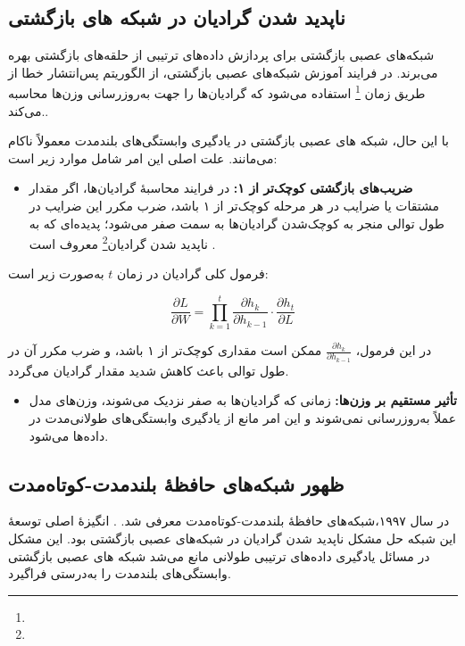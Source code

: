 \subsection{ناپدید شدن گرادیان در شبکه های بازگشتی}
شبکه‌های عصبی بازگشتی برای پردازش داده‌های ترتیبی از حلقه‌های بازگشتی بهره می‌برند. در فرایند آموزش شبکه‌های عصبی بازگشتی، از الگوریتم پس‌انتشار خطا از طریق زمان \footnote{} استفاده می‌شود که گرادیان‌ها را جهت به‌روزرسانی وزن‌ها محاسبه می‌کند.\cite{rumelhart1986learning}.

با این حال، شبکه های عصبی بازگشتی در یادگیری وابستگی‌های بلندمدت معمولاً ناکام می‌مانند. علت اصلی این امر شامل موارد زیر است:

\begin{itemize}
	\item \textbf{ضریب‌های بازگشتی کوچک‌تر از ۱:}
	در فرایند محاسبهٔ گرادیان‌ها، اگر مقدار مشتقات یا ضرایب در هر مرحله کوچک‌تر از ۱ باشد، ضرب مکرر این ضرایب در طول توالی منجر به کوچک‌شدن گرادیان‌ها به سمت صفر می‌شود؛ پدیده‌ای که به ناپدید شدن گرادیان\footnote{} معروف است
	\cite{hochreiter1998vanishing}.
\end{itemize}

فرمول کلی گرادیان در زمان \( t \) به‌صورت زیر است:

\begin{equation}
	\frac{\partial L}{\partial W} = \prod_{k=1}^{t} \frac{\partial h_k}{\partial h_{k-1}} \cdot \frac{\partial h_t}{\partial L}
\end{equation}

در این فرمول، \( \frac{\partial h_k}{\partial h_{k-1}} \) ممکن است مقداری کوچک‌تر از ۱ باشد، و ضرب مکرر آن در طول توالی باعث کاهش شدید مقدار گرادیان می‌گردد.

\begin{itemize}
	\item \textbf{تأثیر مستقیم بر وزن‌ها:}
	زمانی که گرادیان‌ها به صفر نزدیک می‌شوند، وزن‌های مدل عملاً به‌روزرسانی نمی‌شوند و این امر مانع از یادگیری وابستگی‌های طولانی‌مدت در داده‌ها می‌شود\cite{goodfellow2016deep}.
\end{itemize}

\subsection{ظهور شبکه‌های حافظهٔ بلندمدت-کوتاه‌مدت}
در سال ۱۹۹۷،شبکه‌های حافظهٔ بلندمدت-کوتاه‌مدت  معرفی شد.
\cite{hochreiter1997long}.
انگیزهٔ اصلی توسعهٔ این شبکه حل مشکل ناپدید شدن گرادیان در شبکه‌های عصبی بازگشتی بود. این مشکل در مسائل یادگیری داده‌های ترتیبی طولانی مانع می‌شد شبکه های عصبی بازگشتی وابستگی‌های بلندمدت را به‌درستی فراگیرد.

